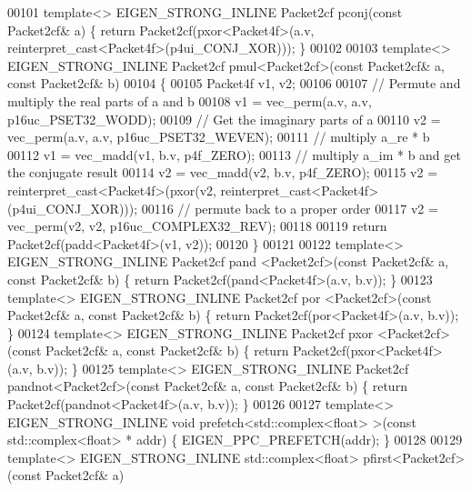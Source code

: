 \begin{DoxyCode}
00101 \textcolor{keyword}{template}<> EIGEN\_STRONG\_INLINE Packet2cf pconj(\textcolor{keyword}{const} Packet2cf& a) \{ \textcolor{keywordflow}{return} Packet2cf(pxor<Packet4f>(a.v, 
      reinterpret\_cast<Packet4f>(p4ui\_CONJ\_XOR))); \}
00102 
00103 \textcolor{keyword}{template}<> EIGEN\_STRONG\_INLINE Packet2cf pmul<Packet2cf>(\textcolor{keyword}{const} Packet2cf& a, \textcolor{keyword}{const} Packet2cf& b)
00104 \{
00105   Packet4f v1, v2;
00106 
00107   \textcolor{comment}{// Permute and multiply the real parts of a and b}
00108   v1 = vec\_perm(a.v, a.v, p16uc\_PSET32\_WODD);
00109   \textcolor{comment}{// Get the imaginary parts of a}
00110   v2 = vec\_perm(a.v, a.v, p16uc\_PSET32\_WEVEN);
00111   \textcolor{comment}{// multiply a\_re * b }
00112   v1 = vec\_madd(v1, b.v, p4f\_ZERO);
00113   \textcolor{comment}{// multiply a\_im * b and get the conjugate result}
00114   v2 = vec\_madd(v2, b.v, p4f\_ZERO);
00115   v2 = \textcolor{keyword}{reinterpret\_cast<}Packet4f\textcolor{keyword}{>}(pxor(v2, reinterpret\_cast<Packet4f>(p4ui\_CONJ\_XOR)));
00116   \textcolor{comment}{// permute back to a proper order}
00117   v2 = vec\_perm(v2, v2, p16uc\_COMPLEX32\_REV);
00118   
00119   \textcolor{keywordflow}{return} Packet2cf(padd<Packet4f>(v1, v2));
00120 \}
00121 
00122 \textcolor{keyword}{template}<> EIGEN\_STRONG\_INLINE Packet2cf pand   <Packet2cf>(\textcolor{keyword}{const} Packet2cf& a, \textcolor{keyword}{const} Packet2cf& b) \{ \textcolor{keywordflow}{
      return} Packet2cf(pand<Packet4f>(a.v, b.v)); \}
00123 \textcolor{keyword}{template}<> EIGEN\_STRONG\_INLINE Packet2cf por    <Packet2cf>(\textcolor{keyword}{const} Packet2cf& a, \textcolor{keyword}{const} Packet2cf& b) \{ \textcolor{keywordflow}{
      return} Packet2cf(por<Packet4f>(a.v, b.v)); \}
00124 \textcolor{keyword}{template}<> EIGEN\_STRONG\_INLINE Packet2cf pxor   <Packet2cf>(\textcolor{keyword}{const} Packet2cf& a, \textcolor{keyword}{const} Packet2cf& b) \{ \textcolor{keywordflow}{
      return} Packet2cf(pxor<Packet4f>(a.v, b.v)); \}
00125 \textcolor{keyword}{template}<> EIGEN\_STRONG\_INLINE Packet2cf pandnot<Packet2cf>(\textcolor{keyword}{const} Packet2cf& a, \textcolor{keyword}{const} Packet2cf& b) \{ \textcolor{keywordflow}{
      return} Packet2cf(pandnot<Packet4f>(a.v, b.v)); \}
00126 
00127 \textcolor{keyword}{template}<> EIGEN\_STRONG\_INLINE \textcolor{keywordtype}{void} prefetch<std::complex<float> >(\textcolor{keyword}{const} std::complex<float> * addr)    \{ 
      EIGEN\_PPC\_PREFETCH(addr); \}
00128 
00129 \textcolor{keyword}{template}<> EIGEN\_STRONG\_INLINE std::complex<float>  pfirst<Packet2cf>(\textcolor{keyword}{const} Packet2cf& a)

\end{DoxyCode}
